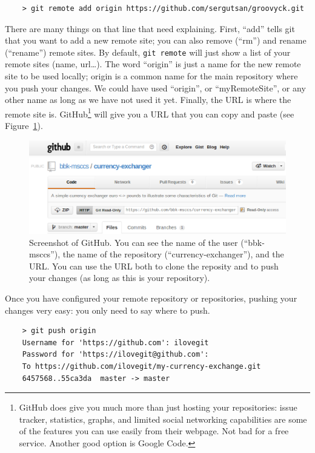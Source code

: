 \begin{verbatim}
    > git remote add origin https://github.com/sergutsan/groovyck.git
\end{verbatim}

There are many things on that line that need explaining. First,
``add'' tells git that you want to add a new remote site; you can also
remove (``rm'') and rename (``rename'') remote sites. By default,
\verb+git remote+ will just show a list of your remote sites (name,
url\ldots). The word ``origin'' is just a name for the new remote site
to be used locally; origin is a common name for the main repository
where you push your changes. We could have used ``origin'', or
``myRemoteSite'', or any other name as long as we have not used it
yet. Finally, the URL is where the remote site
is. GitHub\footnote{GitHub does give you much more than just hosting
  your repositories: issue tracker, statistics, graphs, and limited
  social networking capabilities are some of the features you can use
  easily from their webpage. Not bad for a free service. Another good
  option is Google Code.} will give
you a URL that you can copy and paste (see Figure~\ref{fig:github}).

\begin{figure}[htbp]
  \centering
  \includegraphics[width=\textwidth]{gfx/gitHubScreenshot.eps}
  \caption{Screenshot of GitHub. You can see the name of the user
    (``bbk-msccs''), the name of the repository
    (``currency-exchanger''), and the URL. You can use the URL both to
    clone the reposity and to push your changes (as long as this is
    your repository).}
  \label{fig:github}
\end{figure}

Once you have configured your remote repository or repositories,
pushing your changes very easy: you only need to say where to push. 

\begin{verbatim}
    > git push origin 
    Username for 'https://github.com': ilovegit
    Password for 'https://ilovegit@github.com':
    To https://github.com/ilovegit/my-currency-exchange.git
    6457568..55ca3da  master -> master
\end{verbatim}

